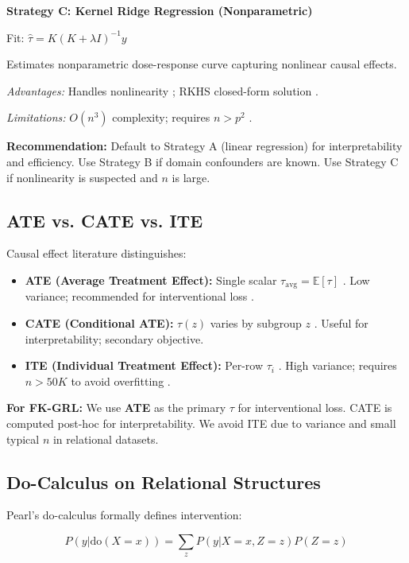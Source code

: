 \documentclass[11pt,letterpaper]{article}
\begin{document}
\textbf{Strategy C: Kernel Ridge Regression (Nonparametric)}

Fit: $\hat{\tau} = K(K + \lambda I)^{-1} y$ \cite{Schoelkopf2020}

Estimates nonparametric dose-response curve capturing nonlinear causal effects.

\textit{Advantages:} Handles nonlinearity \cite{Schoelkopf2020}; RKHS closed-form solution \cite{Schoelkopf2020}.

\textit{Limitations:} $O(n^3)$ complexity; requires $n > p^2$ \cite{Schoelkopf2020}.

\textbf{Recommendation:} Default to Strategy A (linear regression) for interpretability and efficiency. Use Strategy B if domain confounders are known. Use Strategy C if nonlinearity is suspected and $n$ is large.

\subsection{ATE vs. CATE vs. ITE}

Causal effect literature distinguishes:

\begin{itemize}
\item \textbf{ATE (Average Treatment Effect):} Single scalar $\tau_{\text{avg}} = \mathbb{E}[\tau]$ \cite{Kunzel2019}. Low variance; recommended for interventional loss \cite{Kunzel2019}.
\item \textbf{CATE (Conditional ATE):} $\tau(z)$ varies by subgroup $z$ \cite{Kunzel2019}. Useful for interpretability; secondary objective.
\item \textbf{ITE (Individual Treatment Effect):} Per-row $\tau_i$ \cite{Kunzel2019}. High variance; requires $n > 50K$ to avoid overfitting \cite{Kunzel2019}.
\end{itemize}

\textbf{For FK-GRL:} We use \textbf{ATE} as the primary $\tau$ for interventional loss. CATE is computed post-hoc for interpretability. We avoid ITE due to variance and small typical $n$ in relational datasets.

\subsection{Do-Calculus on Relational Structures}

Pearl's do-calculus \cite{Pearl2009} formally defines intervention:

$$P(y|\text{do}(X=x)) = \sum_z P(y|X=x, Z=z) P(Z=z)$$
\end{document}
